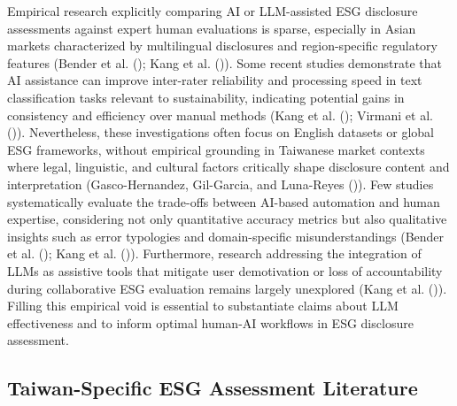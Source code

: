 \documentclass[
  12pt,
]{article}
\begin{document}
Empirical research explicitly comparing AI or LLM-assisted ESG
disclosure assessments against expert human evaluations is sparse,
especially in Asian markets characterized by multilingual disclosures
and region-specific regulatory features (Bender et al.
(); Kang et al.
()). Some recent studies demonstrate that
AI assistance can improve inter-rater reliability and processing speed
in text classification tasks relevant to sustainability, indicating
potential gains in consistency and efficiency over manual methods (Kang
et al. (); Virmani et al.
()). Nevertheless, these investigations
often focus on English datasets or global ESG frameworks, without
empirical grounding in Taiwanese market contexts where legal,
linguistic, and cultural factors critically shape disclosure content and
interpretation (Gasco-Hernandez, Gil-Garcia, and Luna-Reyes
()). Few studies systematically
evaluate the trade-offs between AI-based automation and human expertise,
considering not only quantitative accuracy metrics but also qualitative
insights such as error typologies and domain-specific misunderstandings
(Bender et al. (); Kang et al.
()). Furthermore, research addressing the
integration of LLMs as assistive tools that mitigate user demotivation
or loss of accountability during collaborative ESG evaluation remains
largely unexplored (Kang et al. ()).
Filling this empirical void is essential to substantiate claims about
LLM effectiveness and to inform optimal human-AI workflows in ESG
disclosure assessment.

\subsection{Taiwan-Specific ESG Assessment
Literature}\label{taiwan-specific-esg-assessment-literature}
\end{document}
